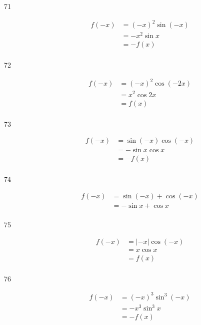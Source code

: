 \documentclass{exam}
\begin{document}
\begin{description}
      \pagebreak

      \item[71]
        \begin{align*}
          f(-x) & = (-x)^2 \sin(-x) \\
                & = - x^2 \sin x \\
                & = - f(x) \\
        \end{align*}


      \item[72]
        \begin{align*}
          f(-x) & = (-x)^2 \cos(-2x) \\
                & = x^2 \cos 2x \\
                & = f(x) \\
        \end{align*}


      \item[73]
        \begin{align*}
          f(-x) & = \sin (-x) \cos (-x) \\
                & = - \sin x \cos x \\
                & = -f(x) \\
        \end{align*}


      \item[74]
        \begin{align*}
          f(-x) & = \sin (-x) + \cos (-x) \\
                & = - \sin x + \cos x \\
        \end{align*}


      \item[75]
        \begin{align*}
          f(-x) & = | -x | \cos (-x) \\
                & = x \cos x \\
                & = f(x) \\
        \end{align*}

      \item[76]
        \begin{align*}
          f(-x) & = (-x)^3 \sin^3 (-x) \\
                & = - x^3 \sin^3 x \\
                & = - f(x) \\
        \end{align*}


\end{description}
\end{document}
